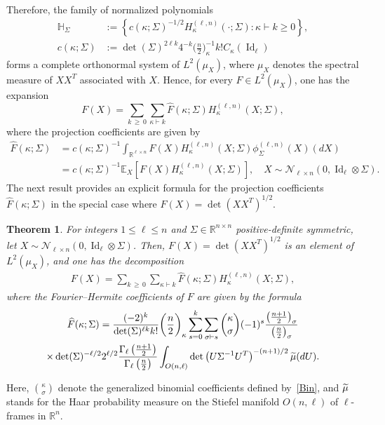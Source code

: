 \documentclass[10pt]{amsart}
\newtheorem{theo}{Theorem}[section]
\theoremstyle{definition}\newtheorem{defi}[theo]{Definition}\newtheorem{rema}[theo]{Remark}\newtheorem{exam}[theo]{Example}\newtheorem{exem}[theo]{Example}\newtheorem{nota}[theo]{Notation}
\DeclareMathOperator{\Id}{Id}
\newcommand{\scN}{\mathscr{N}}
\newcommand{\R}{\mathbb{R}}
\newcommand{\bbH}{\mathbb{H}}
\newcommand{\EX}[2]{\mathbb{E}_{#1}\left[#2\right]}
\let\oldtilde\tilde
\renewcommand*{\tilde}[1]{\mathchoice{\widetilde{#1}}{\widetilde{#1}}{\oldtilde{#1}}{\oldtilde{#1}}}
\begin{document}
Therefore, the family of normalized polynomials
\begin{equation}\label{cSigma}
\begin{split}
\bbH_{\Sigma} &{:=} \left\{ c(\kappa; \Sigma)^{-1/2} H_{\kappa}^{(\ell,n)}(\cdot;\Sigma): \kappa \vdash k \geq0\right\}, \\ c(\kappa;\Sigma) &{:=}\det(\Sigma)^{2\ell k}4^{-k}\bigg(\frac{n}{2}\bigg)_{\kappa}^{-1} k!C_{\kappa}(\Id_{\ell})
\end{split}
\end{equation}
forms a complete orthonormal system of $L^2(\mu_X)$, where $\mu_X$ denotes the spectral measure of $XX^T$ associated with $X$. Hence, for every $F \in L^2(\mu_X)$, one has the expansion
\[
F(X) = \sum_{k\,\geq\,0} \sum_{\kappa\vdash k} \widehat{F}(\kappa; \Sigma) H_{\kappa}^{(\ell,n)}(X; \Sigma),
\]
where the projection coefficients are given by
\begin{equation}\label{Fourier}
\begin{split}
\widehat{F}(\kappa; \Sigma) &= c(\kappa;\Sigma)^{-1}
\int_{\R^{\ell\times n}} F(X) H^{(\ell,n)}_{\kappa}(X;\Sigma) \phi_{\Sigma}^{(\ell,n)}(X) (dX) \\
&= c(\kappa;\Sigma)^{-1}
\EX{X}{F(X) H^{(\ell,n)}_{\kappa}(X;\Sigma)}, \quad X \sim \scN_{\ell \times n}(0, \Id_{\ell}\otimes \Sigma).
\end{split}
\end{equation}
The next result provides an explicit formula for the projection coefficients $\widehat{F}(\kappa; \Sigma)$ in the special case where $F(X) = \det(XX^T)^{1/2}$.

\begin{theo}\label{CoeffSigma}
For integers $1\leq \ell \leq n$ and $\Sigma \in \R^{n\times n}$ positive-definite symmetric, let $X \sim \scN_{\ell \times n}(0,\Id_{\ell}\otimes \Sigma)$. Then, $F(X)=\det(XX^T)^{1/2}$ is an element of $L^2(\mu_X)$, and one has the decomposition
\begin{gather*}
F(X)= \sum_{k\,\geq\,0} \sum_{\kappa\vdash k} \widehat{F}(\kappa;\Sigma) H_{\kappa}^{(\ell,n)}(X;\Sigma),
\end{gather*}
where the Fourier--Hermite coefficients of $F$ are given by the formula
\begin{multline}\label{For1}
\widehat{F}(\kappa; \Sigma) = \frac{ (-2)^{k} }{\det(\Sigma)^{\ell k} k!}\bigg(\frac{n}{2}\bigg)_{\kappa}
\sum_{s=0}^{k} \sum_{\sigma\vdash s} \binom{\kappa}{\sigma} (-1)^s\frac{\left(\frac{n+1}{2}\right)_{\sigma}}{\left(\frac{n}{2}\right)_{\sigma}} \\
\times
\det(\Sigma)^{-\ell/2} 2^{\ell/2} \frac{\Gamma_{\ell}\left(\frac{n+1}{2}\right)}{\Gamma_{\ell}\left(\frac{n}{2}\right)} \int_{O(n,\ell)} \det\left(U\Sigma^{-1}U^T\right)^{-(n+1)/2} \tilde{\mu}(dU).
\end{multline}
\end{theo}
Here, $\binom{\kappa}{\sigma}$ denote the generalized binomial coefficients defined by~\eqref{Bin}, and $\tilde{\mu}$ stands for the Haar probability measure on the Stiefel manifold $O(n,\ell)$ of $\ell$-frames in $\R^n$.
\end{document}
